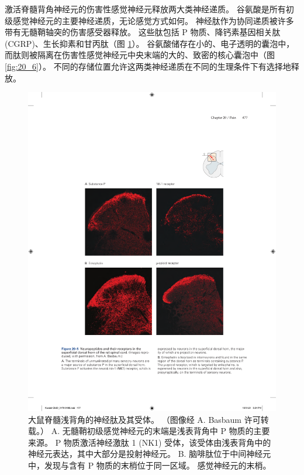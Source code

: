激活脊髓背角神经元的伤害性感觉神经元释放两大类神经递质。 
谷氨酸是所有初级感觉神经元的主要神经递质，无论感觉方式如何。 
神经肽作为协同递质被许多带有无髓鞘轴突的伤害感受器释放。 
这些肽包括 P 物质、降钙素基因相关肽 (CGRP)、生长抑素和甘丙肽（图 \ref{fig:20_5}）。 
谷氨酸储存在小的、电子透明的囊泡中，而肽则被隔离在伤害性感觉神经元中央末端的大的、致密的核心囊泡中（图 \ref{fig:20_6}）。 
不同的存储位置允许这两类神经递质在不同的生理条件下有选择地释放。

\begin{figure}[htbp]
	\centering
	\includegraphics[width=0.7\linewidth]{chap20/fig_20_5}
	\caption{大鼠脊髓浅背角的神经肽及其受体。 （图像经 A. Basbaum 许可转载。） 
		A. 无髓鞘初级感觉神经元的末端是浅表背角中 P 物质的主要来源。 
		P 物质激活神经激肽 1 (NK1) 受体，该受体由浅表背角中的神经元表达，其中大部分是投射神经元。 
		B. 脑啡肽位于中间神经元中，发现与含有 P 物质的末梢位于同一区域。 
		感觉神经元的末梢。}
	\label{fig:20_5}
\end{figure}



